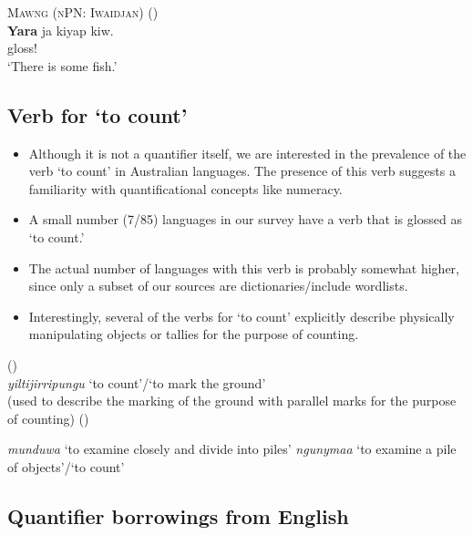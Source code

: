 \documentclass{article}
\makeatletter
\newcommand{\ofy}{/85} %
\makeatother
\begin{document}
\begin{exe}
  \ex\label{ex:dyara} \textsc{Mawng (nPN: Iwaidjan)} (\citealt{ngaralk})\\
  \gll \textbf{Yara} ja kiyap kiw.\\
  gloss!\\
  \glt `There is some fish.' %
\end{exe}

\subsection{Verb for `to count'}

\begin{itemize}
\item Although it is not a quantifier itself, we are interested in the prevalence of the verb `to count' in Australian languages. The presence of this verb suggests a familiarity with quantificational concepts like numeracy.
\item A small number (7\ofy) languages in our survey have a verb that is glossed as `to count.'
\item The actual number of languages with this verb is probably somewhat higher, since only a subset of our sources are dictionaries/include wordlists.
\item Interestingly, several of the verbs for `to count' explicitly describe physically manipulating objects or tallies for the purpose of counting.
\end{itemize}

\begin{exe}
 (\citealt[179]{pintupi77})\\
\textit{yiltijirripungu} `to count'/`to mark the ground'\\
(used to describe the marking of the ground with parallel marks for the purpose of counting)
 (\citealt{heath84})
\begin{xlist}
\ex \textit{munduwa} `to examine closely and divide into piles' 
\ex \textit{ngunymaa} `to examine a pile of objects'/`to count'
\end{xlist}
\end{exe} 

\subsection{Quantifier borrowings from English}
\end{document}
